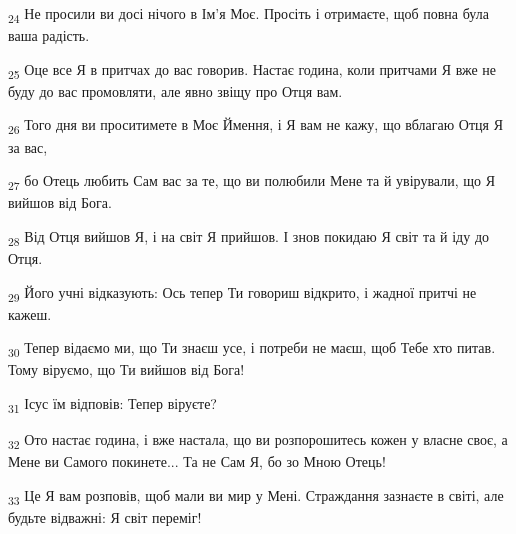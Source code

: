 \begin{tcolorbox}
\textsubscript{24} Не просили ви досі нічого в Ім'я Моє. Просіть і отримаєте, щоб повна була ваша радість.
\end{tcolorbox}
\begin{tcolorbox}
\textsubscript{25} Оце все Я в притчах до вас говорив. Настає година, коли притчами Я вже не буду до вас промовляти, але явно звіщу про Отця вам.
\end{tcolorbox}
\begin{tcolorbox}
\textsubscript{26} Того дня ви проситимете в Моє Ймення, і Я вам не кажу, що вблагаю Отця Я за вас,
\end{tcolorbox}
\begin{tcolorbox}
\textsubscript{27} бо Отець любить Сам вас за те, що ви полюбили Мене та й увірували, що Я вийшов від Бога.
\end{tcolorbox}
\begin{tcolorbox}
\textsubscript{28} Від Отця вийшов Я, і на світ Я прийшов. І знов покидаю Я світ та й іду до Отця.
\end{tcolorbox}
\begin{tcolorbox}
\textsubscript{29} Його учні відказують: Ось тепер Ти говориш відкрито, і жадної притчі не кажеш.
\end{tcolorbox}
\begin{tcolorbox}
\textsubscript{30} Тепер відаємо ми, що Ти знаєш усе, і потреби не маєш, щоб Тебе хто питав. Тому віруємо, що Ти вийшов від Бога!
\end{tcolorbox}
\begin{tcolorbox}
\textsubscript{31} Ісус їм відповів: Тепер віруєте?
\end{tcolorbox}
\begin{tcolorbox}
\textsubscript{32} Ото настає година, і вже настала, що ви розпорошитесь кожен у власне своє, а Мене ви Самого покинете... Та не Сам Я, бо зо Мною Отець!
\end{tcolorbox}
\begin{tcolorbox}
\textsubscript{33} Це Я вам розповів, щоб мали ви мир у Мені. Страждання зазнаєте в світі, але будьте відважні: Я світ переміг!
\end{tcolorbox}
